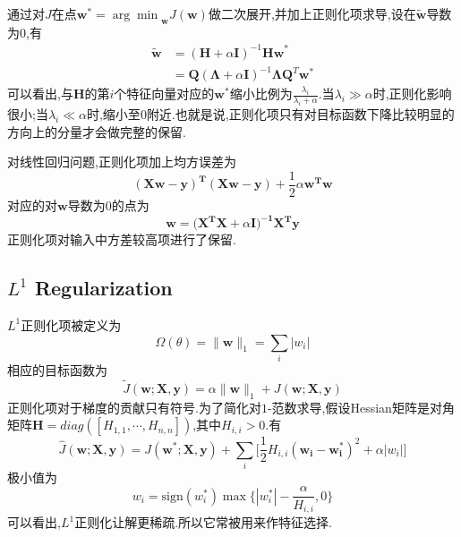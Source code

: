 通过对$J$在点$\mathbf w^\ast={\arg\min}_\mathbf wJ(\mathbf w)$做二次展开,并加上正则化项求导,设在$\tilde{\mathbf w}$导数为0,有
\begin{equation}\begin{split}
\tilde{\mathbf w}&=(\mathbf H+\alpha\mathbf I)^{-1}\mathbf{Hw}^\ast\\
&=\mathbf Q(\mathbf\Lambda+\alpha\mathbf I)^{-1}\mathbf\Lambda\mathbf Q^T\mathbf w^\ast
\end{split}\end{equation}
可以看出,与$\mathbf H$的第$i$个特征向量对应的$\mathbf w^\ast$缩小比例为$\frac{\lambda_i}{\lambda_i+\alpha}$.当$\lambda_i\gg\alpha$时,正则化影响很小;当$\lambda_i\ll\alpha$时,缩小至$0$附近.也就是说,正则化项只有对目标函数下降比较明显的方向上的分量才会做完整的保留.

对线性回归问题,正则化项加上均方误差为
\begin{equation}
\mathbf{(Xw-y)^T(Xw-y)}+\frac{1}{2}\alpha\mathbf{w^Tw}
\end{equation}
对应的对$\mathbf w$导数为$0$的点为
\begin{equation}
\mathbf{w=(X^TX}+\alpha\mathbf{I)^{-1}X^Ty}
\end{equation}
正则化项对输入中方差较高项进行了保留.

\subsection{$L^1$ Regularization}\label{sec:l1_regularization}

$L^1$正则化项被定义为
\begin{equation}
\Omega(\theta)=\|\mathbf w\|_1=\sum_i|w_i|
\end{equation}
相应的目标函数为
\begin{equation}
\tilde J(\mathbf{w;X,y})=\alpha\|\mathbf w\|_1+J(\mathbf{w;X,y})
\end{equation}
正则化项对于梯度的贡献只有符号.为了简化对$1$-范数求导,假设Hessian矩阵是对角矩阵$\mathbf H=diag([H_{1,1},\cdots,H_{n,n}])$,其中$H_{i,i}>0$.有
\begin{equation}
\hat J(\mathbf{w;X,y})=J(\mathbf{w^\ast;X,y})+\sum_i\Big[\frac{1}{2}H_{i,i}(\mathbf{w_i-w_i^\ast})^2+\alpha|w_i|\Big]
\end{equation}
极小值为
\begin{equation}
w_i=\text{sign}(w_i^\ast)\max\{|w_i^\ast|-\frac{\alpha}{H_{i,i}},0\}
\end{equation}
可以看出,$L^1$正则化让解更稀疏.所以它常被用来作特征选择.


